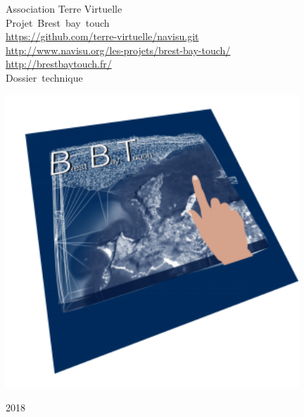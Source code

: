 \begin{titlepage}
\begin{center}
{\LARGE\sc Association Terre Virtuelle}\\
\vspace{2cm}
\mbox{\LARGE \sc Projet Brest bay touch}\\
\vspace{1cm}
\href{https://github.com/terre-virtuelle/navisu.git}{https://github.com/terre-virtuelle/navisu.git}\\
\href{http://www.navisu.org/les-projets/brest-bay-touch/}{http://www.navisu.org/les-projets/brest-bay-touch/}\\
\href{http://brestbaytouch.fr/}{http://brestbaytouch.fr/}\\

\vspace{2cm}
\mbox{\LARGE \sc Dossier technique}\\
\vspace{1cm}

\begin{bfseries}

\begin{Huge}
\soustitre
\end{Huge}

\vspace{.8cm}

\null\vfill


\begin{center}
	\includegraphics[width=11cm]{images/logobbtwiretest0-300x300.png}
\end{center}

\null\vfill

\vspace{1cm}
2018

\end{bfseries}
\end{center}

\end{titlepage}

